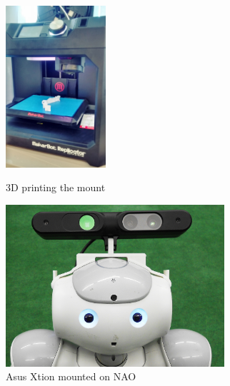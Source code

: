 \begin{figure}	 	
	\begin{minipage}
		{.45 
			\textwidth} 
		\centering 
		\includegraphics[height=60mm]{figures/content/xtion-mount-3d.jpg} \caption*{3D printing the mount} 
	\end{minipage}
	\begin{minipage}
		{.45 
			\textwidth}  
		\centering
		\includegraphics[height=60mm]{figures/content/xtion-mount.jpg} \caption*{Asus Xtion mounted on NAO}
	\end{minipage}
\end{figure}
\label{fg:xtion:mount}

